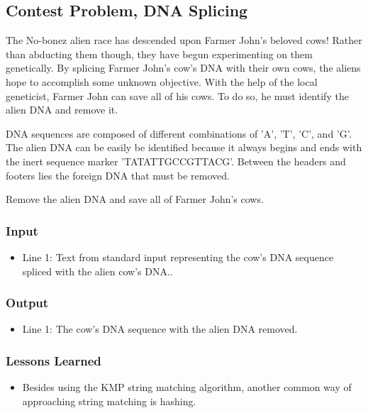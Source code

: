 \subsection{Contest Problem, DNA Splicing}
The No-bonez alien race has descended upon Farmer John's beloved cows!
Rather than abducting them though, they have begun experimenting on them genetically.
By splicing Farmer John's cow's DNA with their own cows, the aliens hope to accomplish some unknown objective.
With the help of the local geneticist, Farmer John can save all of his cows.
To do so, he must identify the alien DNA and remove it.

DNA sequences are composed of different combinations of 'A', 'T', 'C', and 'G'.
The alien DNA can be easily be identified because it always begins and ends with the inert sequence marker \mbox{'TATATTGCCGTTACG'}.
Between the headers and footers lies the foreign DNA that must be removed.

Remove the alien DNA and save all of Farmer John's cows.

\subsubsection{Input}
\begin{itemize}
\item Line 1: Text from standard input representing the cow's DNA sequence spliced with the alien cow's DNA..
\end{itemize}


\subsubsection{Output}
\begin{itemize}
\item Line 1: The cow's DNA sequence with the alien DNA removed.
\end{itemize}


\subsubsection{Lessons Learned}
\begin{itemize}
	\item Besides using the KMP string matching algorithm, another common way of approaching string matching is hashing.
\end{itemize}

